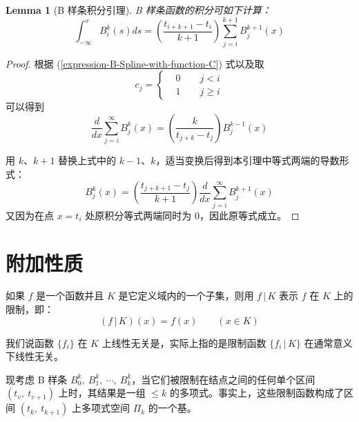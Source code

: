 \documentclass[a4paper]{article}
\newtheorem{lemma}{Lemma}
\begin{document}
    \begin{lemma}[B 样条积分引理]
        B 样条函数的积分可如下计算：
        \begin{equation}
            \int_{-\infty}^{x} B_{i}^{k}(s) ds = \left( \frac{t_{i+k+1} - t_{i}}{k+1} \right) \sum_{j=i}^{k+1} B_{j}^{k+1}(x)
        \end{equation}
    \end{lemma}
    \begin{proof}[Proof]
        根据 (\ref{expression-B-Spline-with-function-C}) 式以及取
        \begin{equation}
           c_j = \left\{\begin{aligned}
               & 0 \qquad j < i\\
               & 1 \qquad j \geqslant i
           \end{aligned}\right.
        \end{equation}
        可以得到
        \begin{equation}
           \frac{d}{dx} \sum_{j = i}^{\infty} B_{j}^{k}(x) = \left(\frac{k}{t_{j+k} - t_{j}}\right) B_{j}^{k-1}(x)
        \end{equation}

        \noindent 用 $k$、$k+1$ 替换上式中的 $k-1$、$k$，适当变换后得到本引理中等式两端的导数形式：
        \begin{equation}
            B_{j}^{k}(x) = \left(\frac{t_{j+k+1} - t_{j}}{k+1}\right) \frac{d}{dx} \sum_{j = i}^{\infty} B_{j}^{k+1}(x)
        \end{equation}
        又因为在点 $x = t_i$ 处原积分等式两端同时为 $0$，因此原等式成立。
    \end{proof}
	
\section{附加性质}

    如果 $f$ 是一个函数并且 $K$ 是它定义域内的一个子集，则用 $f\,|\,K$ 表示 $f$ 在 $K$ 上的限制，即：
    \begin{equation*}
        (f\,|\,K)(x) = f(x) \qquad (x \in K)
    \end{equation*}

    \noindent 我们说函数 $\{f_i\}$ 在 $K$ 上线性无关是，实际上指的是限制函数 $\{f_i\,|\,K\}$ 在通常意义下线性无关。

    现考虑 B 样条 $B_0^k,\ B_1^k,\ \cdots,\ B_k^k$，当它们被限制在结点之间的任何单个区间 $(t_{v},\ t_{v+1})$ 上时，其结果是一组 $\leqslant k$ 的多项式。事实上，这些限制函数构成了区间 $(t_{k},\ t_{k+1})$ 上多项式空间 $\Pi_k$ 的一个基。
\end{document}
